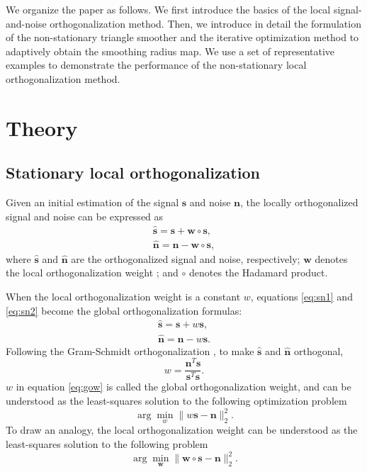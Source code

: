 We organize the paper as follows. We first introduce the basics of the local signal-and-noise orthogonalization method. Then, we introduce in detail the formulation of the non-stationary triangle smoother and the iterative optimization method to adaptively obtain the smoothing radius map. We use a set of representative examples to demonstrate the performance of the non-stationary local orthogonalization method. 

\section{Theory}
\subsection{Stationary local orthogonalization}
Given an initial estimation of the signal $\mathbf{s}$ and noise $\mathbf{n}$, the locally orthogonalized signal and noise can be expressed as\new{:}
\begin{align}
\label{eq:sn1}
\hat{\mathbf{s}} = \mathbf{s} + \mathbf{w} \circ \mathbf{s}, \\
\label{eq:sn2}
\hat{\mathbf{n}} = \mathbf{n} - \mathbf{w} \circ \mathbf{s}, 
\end{align}
where $\hat{\mathbf{s}}$ and $\hat{\mathbf{n}}$ are the orthogonalized signal and noise, respectively; $\mathbf{w}$ denotes the local orthogonalization weight \cite[]{yangkang2015ortho}; and $\circ$ denotes the Hadamard product. 

When the local orthogonalization weight is a constant $w$, equations \ref{eq:sn1} and \ref{eq:sn2} become the global orthogonalization formulas: 
\begin{align}
\label{eq:sn11}
\hat{\mathbf{s}} = \mathbf{s} + w \mathbf{s}, \\
\label{eq:sn22}
\hat{\mathbf{n}} = \mathbf{n} - w \mathbf{s}. 
\end{align}
Following the Gram-Schmidt orthogonalization \cite[]{gram}, to make $\hat{\mathbf{s}}$ and $\hat{\mathbf{n}}$ orthogonal, 
\begin{equation}
\label{eq:gow}
w=\frac{\mathbf{n}^T\mathbf{s}}{\mathbf{s}^T\mathbf{s}}.
\end{equation} 
$w$ in equation \ref{eq:gow} is called the global orthogonalization weight, and
can be understood as the least-squares solution to the following optimization problem
\begin{equation}
\label{eq:gowo}
\arg \min_{w} \parallel w \mathbf{s} - \mathbf{n} \parallel_2^2.
\end{equation} 
To draw an analogy, the local orthogonalization weight can be understood as the least-squares solution to the following problem
\begin{equation}
\label{eq:lowo}
\arg \min_{\mathbf{w}} \parallel  \mathbf{w}\circ\mathbf{s} - \mathbf{n} \parallel_2^2.
\end{equation} 

